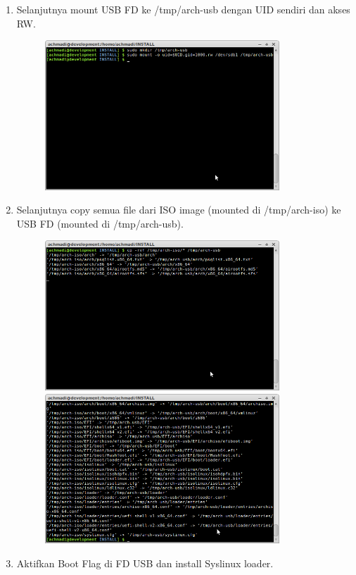 \documentclass[12pt,]{article}
\begin{document}
\begin{enumerate}
		\item Selanjutnya mount USB FD ke /tmp/arch-usb dengan UID sendiri dan akses RW.
		
		\begin{figure}[h]
			\centering
			\includegraphics[width=250pt]{usbubuntu/step_13}
		\end{figure}
	
		\item Selanjutnya copy semua file dari ISO image (mounted di /tmp/arch-iso) ke USB FD (mounted di /tmp/arch-usb).
		
		\begin{figure}[h]
			\centering
			\includegraphics[width=250pt]{usbubuntu/step_14}
			\includegraphics[width=250pt]{usbubuntu/step_15}
		\end{figure} 
	
		\item Aktifkan Boot Flag di FD USB dan install Syslinux loader.
		

\end{enumerate}
\end{document}
